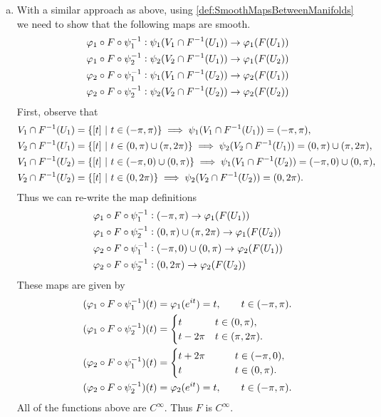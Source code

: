 \begin{solution}
\begin{enumerate}[(a)]
		\item With a similar approach as above, using \autoref{def:SmoothMapsBetweenManifolds} we need to show that the following maps are smooth.
		\begin{align*}
			&\varphi_1\circ F\circ \psi_1^{-1}:\psi_1(V_1\cap F^{-1}(U_1)) \to \varphi_1(F(U_1))\\
			&\varphi_1\circ F\circ \psi_2^{-1}:\psi_2(V_2\cap F^{-1}(U_1)) \to \varphi_1(F(U_2)) \\
			&\varphi_2\circ F\circ \psi_1^{-1}:\psi_1(V_1\cap F^{-1}(U_2)) \to \varphi_2(F(U_1))\\
			&\varphi_2\circ F\circ \psi_2^{-1}:\psi_2(V_2\cap F^{-1}(U_2)) \to \varphi_2(F(U_2))
		\end{align*}
		First, observe that
		\begin{align*}
			&V_1 \cap F^{-1}(U_1) = \{[t]\ |\ t\in (-\pi,\pi)\} \implies \psi_1(V_1 \cap F^{-1}(U_1)) = (-\pi,\pi), 
			\\
			&V_2 \cap F^{-1}(U_1) = \{[t]\ |\ t\in (0,\pi)\cup(\pi,2\pi)\} \implies  \psi_2(V_2 \cap F^{-1}(U_1)) = (0,\pi)\cup(\pi,2\pi),
			\\
			&V_1\cap F^{-1}(U_2) = \{[t]\ |\ t\in (-\pi,0)\cup(0,\pi)\} \implies \psi_1(V_1\cap F^{-1}(U_2)) = (-\pi,0)\cup(0,\pi), 
			\\
			&V_2\cap F^{-1}(U_2) = \{[t]\ |\ t\in (0,2\pi)\} \implies \psi_2(V_2\cap F^{-1}(U_2)) = (0,2\pi).
		\end{align*}
		Thus we can re-write the map definitions
		\begin{align*}
			&\varphi_1\circ F\circ \psi_1^{-1}:(-\pi,\pi) \to \varphi_1(F(U_1))\\
			&\varphi_1\circ F\circ \psi_2^{-1}:(0,\pi)\cup(\pi,2\pi) \to \varphi_1(F(U_2)) \\
			&\varphi_2\circ F\circ \psi_1^{-1}:(-\pi,0)\cup(0,\pi) \to \varphi_2(F(U_1))\\
			&\varphi_2\circ F\circ \psi_2^{-1}:(0,2\pi) \to \varphi_2(F(U_2))
		\end{align*}
		These maps are given by
		\begin{align*}
			&(\varphi_1\circ F\circ \psi_1^{-1})(t) = \varphi_1(e^{it}) = t, \qquad t\in(-\pi,\pi) .\\
			&(\varphi_1\circ F\circ \psi_2^{-1})(t) = \begin{cases}
				t \qquad & t\in (0,\pi),\\
				t -2\pi & t\in (\pi,2\pi).
			\end{cases}\\
			&(\varphi_2\circ F\circ \psi_1^{-1})(t) = \begin{cases}
				t + 2\pi \qquad & t\in (-\pi,0),\\
				t \qquad & t\in (0,\pi).
			\end{cases}\\
			&(\varphi_2\circ F\circ \psi_2^{-1})(t) = \varphi_2(e^{it}) = t, \qquad t\in(-\pi,\pi).
		\end{align*}
		All of the functions above are $ C^\infty $. Thus $ F $ is $ C^\infty $.
		

\end{enumerate}
\end{solution}

